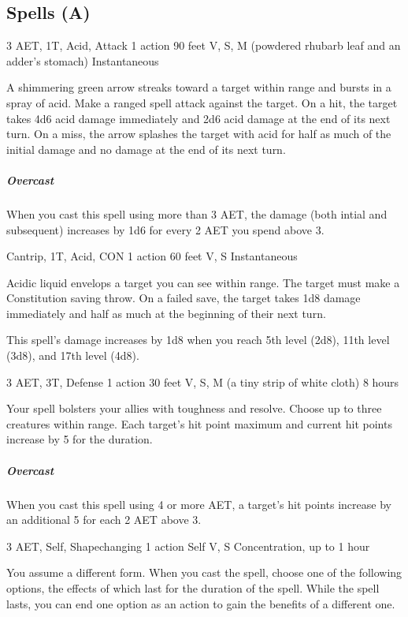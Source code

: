 \subsection{Spells (A)}

{3 AET, 1T, Acid, Attack}
{1 action}
{90 feet}
{V, S, M (powdered rhubarb leaf and an adder's stomach)}
{Instantaneous}

A shimmering green arrow streaks toward a target within range and bursts in a spray of acid. Make a ranged spell attack against the target. On a hit, the target takes 4d6 acid damage immediately and 2d6 acid damage at the end of its next turn. On a miss, the arrow splashes the target with acid for half as much of the initial damage and no damage at the end of its next turn.

\subparagraph*{Overcast} When you cast this spell using more than 3 AET, the damage (both intial and subsequent) increases by 1d6 for every 2 AET you spend above 3.

{Cantrip, 1T, Acid, CON}
{1 action}
{60 feet}
{V, S}
{Instantaneous}

Acidic liquid envelops a target you can see within range. The target must make a Constitution saving throw. On a failed save, the target takes 1d8 damage immediately and half as much at the beginning of their next turn.

This spell's damage increases by 1d8 when you reach 5th level (2d8), 11th level (3d8), and 17th level (4d8).


{3 AET, 3T, Defense}
{1 action}
{30 feet}
{V, S, M (a tiny strip of white cloth)}
{8 hours}

Your spell bolsters your allies with toughness and resolve. Choose up to three creatures within range. Each target's hit point maximum and current hit points increase by 5 for the duration.

\subparagraph*{Overcast} When you cast this spell using 4 or more AET, a target's hit points increase by an additional 5 for each 2 AET above 3.


{3 AET, Self, Shapechanging}
{1 action}
{Self}
{V, S}
{Concentration, up to 1 hour}

You assume a different form. When you cast the spell, choose one of the following options, the effects of which last for the duration of the spell. While the spell lasts, you can end one option as an action to gain the benefits of a different one.


